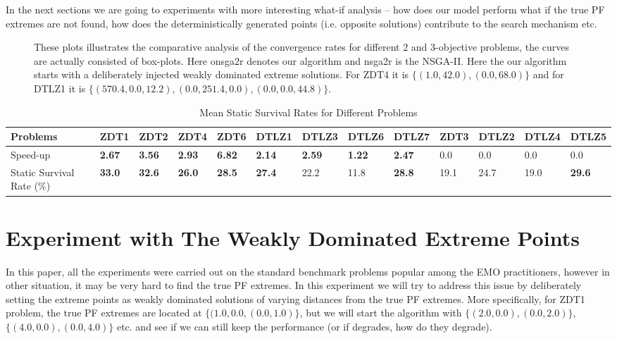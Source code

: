\documentclass[journal]{IEEEtran}
\let\MYoriglatexcaption\caption
\renewcommand{\caption}[2][\relax]{\MYoriglatexcaption[#2]{#2}}
\begin{document}
In the next sections we are going to experiments with more interesting what-if analysis -- how does our model perform what if the true PF extremes are not found, how does the deterministically generated points (i.e. opposite solutions) contribute to the search mechanism etc.
%
\begin{figure*}[pb!]
	\centering
	\hfill
	\caption{These plots illustrates the comparative analysis of the convergence rates for different 2 and 3-objective problems, the curves are actually consisted of box-plots. Here onsga2r denotes our algorithm and nsga2r is the NSGA-II. Here the our algorithm starts with a deliberately injected weakly dominated extreme solutions. For ZDT4 it is \(\{(1.0, 42.0), (0.0, 68.0)\}\) and for DTLZ1 it is \(\{(570.4, 0.0, 12.2),(0.0, 251.4, 0.0),(0.0, 0.0, 44.8)\}\).}
	\label{plot:weak-hv}
\end{figure*}
%
%
\begin{table*}[tp!]
\caption{Mean Static Survival Rates for Different Problems}
\label{table:survival}
\centering
{\renewcommand{\arraystretch}{1.5}
\begin{tabular}{l|llllllll|llll}
Problems		& ZDT1 & ZDT2 & ZDT4 & ZDT6 & DTLZ1 & DTLZ3 & DTLZ6 & DTLZ7 & ZDT3 & DTLZ2 & DTLZ4 & DTLZ5\\ \hline
Speed-up	& \textbf{2.67} & \textbf{3.56} & \textbf{2.93} & \textbf{6.82} & \textbf{2.14} & \textbf{2.59} & \textbf{1.22} & \textbf{2.47} & 0.0 & 0.0 & 0.0 & 0.0\\ \hline
Static Survival Rate (\(\%\))	& \textbf{33.0} & \textbf{32.6}	& \textbf{26.0} & \textbf{28.5} & \textbf{27.4} & 22.2 & 11.8 & \textbf{28.8} & 19.1 & 24.7 & 19.0 & \textbf{29.6}\\ \hline
\end{tabular}}
\end{table*}
%
\section{Experiment with The Weakly Dominated Extreme Points}
\label{sec:weak-extremes}
In this paper, all the experiments were carried out on the standard benchmark problems popular among the EMO practitioners, however in other situation, it may be very hard to find the true PF extremes. In this experiment we will try to address this issue by deliberately setting the extreme points as weakly dominated solutions of varying distances from the true PF extremes. More specifically, for ZDT1 problem, the true PF extremes are located at \(\{(1.0, 0.0, (0.0, 1.0)\}\), but we will start the algorithm with \(\{(2.0, 0.0), (0.0, 2.0)\}\), \(\{(4.0, 0.0), (0.0, 4.0)\}\) etc. and see if we can still keep the performance (or if degrades, how do they degrade).
\end{document}
